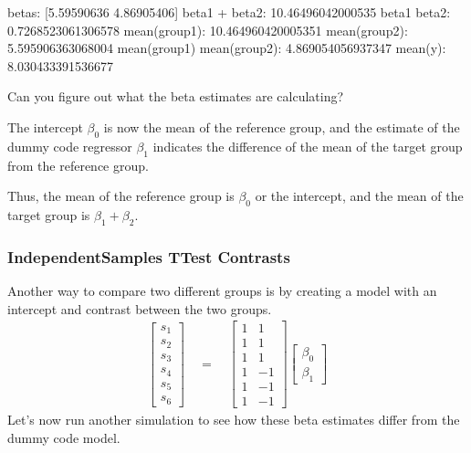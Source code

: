 \documentclass[letterpaper,10pt,english]{sphinxmanual}
\begin{document}
\begin{sphinxVerbatim}[commandchars=\\\{\}]
betas: [5.59590636 4.86905406]
beta1 + beta2: 10.46496042000535
beta1 \PYGZhy{} beta2: 0.7268523061306578
mean(group1): 10.464960420005351
mean(group2): 5.595906363068004
mean(group1) \PYGZhy{} mean(group2): 4.869054056937347
mean(y): 8.030433391536677
\end{sphinxVerbatim}

\noindent{}

Can you figure out what the beta estimates are calculating?

The intercept \(\beta_0\) is now the mean of the reference group, and the estimate of the dummy code regressor \(\beta_1\) indicates the difference of the mean of the target group from the reference group.

Thus, the mean of the reference group is \(\beta_0\) or the intercept, and the mean of the target group is \(\beta_1 + \beta_2\).


\subsubsection{Independent\sphinxhyphen{}Samples T\sphinxhyphen{}Test \sphinxhyphen{} Contrasts}
\label{\detokenize{content/Group_Analysis:independent-samples-t-test-contrasts}}
Another way to compare two different groups is by creating a model with an intercept and contrast between the two groups.
\begin{equation*}
\begin{split}
\begin{bmatrix}
s_1 \\
s_2 \\
s_3 \\
s_4 \\
s_5 \\
s_6
\end{bmatrix}
\quad
=
\quad
\begin{bmatrix}
1 & 1\\
1 & 1\\
1 & 1\\
1 & -1\\
1 & -1\\
1 & -1
\end{bmatrix}
\begin{bmatrix}
\beta_0 \\
\beta_1
\end{bmatrix}
\end{split}
\end{equation*}
Let’s now run another simulation to see how these beta estimates differ from the dummy code model.
\end{document}
